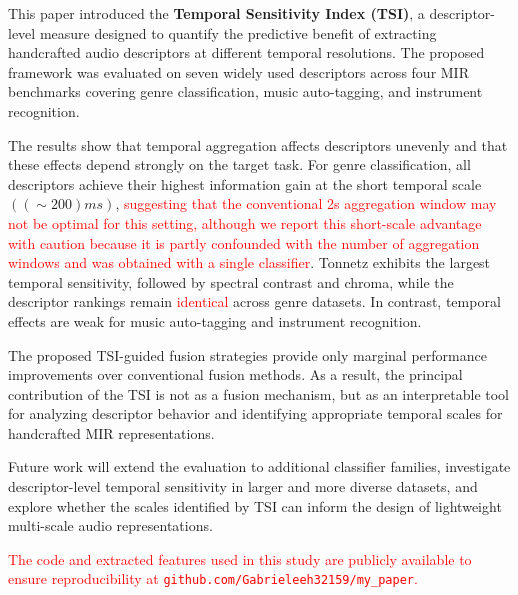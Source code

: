 \documentclass[runningheads]{llncs}
\begin{document}
This paper introduced the \textbf{Temporal Sensitivity Index (TSI)}, a descriptor-level measure designed to quantify the predictive benefit of extracting handcrafted audio descriptors at different temporal resolutions. The proposed framework was evaluated on seven widely used descriptors across four MIR benchmarks covering genre classification, music auto-tagging, and instrument recognition.

The results show that temporal aggregation affects descriptors unevenly and that these effects depend strongly on the target task. For genre classification, all descriptors achieve their highest information gain at the short temporal scale $((\sim 200) ms)$, \textcolor{red}{suggesting that the conventional 2s aggregation window may not be optimal for this setting, although we report this short-scale advantage with caution because it is partly confounded with the number of aggregation windows and was obtained with a single classifier}. Tonnetz exhibits the largest temporal sensitivity, followed by spectral contrast and chroma, while the descriptor rankings remain \textcolor{red}{identical} across genre datasets. In contrast, temporal effects are weak for music auto-tagging and instrument recognition.

The proposed TSI-guided fusion strategies provide only marginal performance improvements over conventional fusion methods. As a result, the principal contribution of the TSI is not as a fusion mechanism, but as an interpretable tool for analyzing descriptor behavior and identifying appropriate temporal scales for handcrafted MIR representations.

Future work will extend the evaluation to additional classifier families, investigate descriptor-level temporal sensitivity in larger and more diverse datasets, and explore whether the scales identified by TSI can inform the design of lightweight multi-scale audio representations.

\textcolor{red}{The code and extracted features used in this study are publicly available to ensure reproducibility at \texttt{github.com/Gabrieleeh32159/my\_paper}.}


%
%


\end{document}
